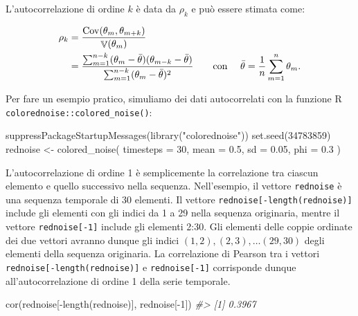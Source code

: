 \documentclass[
  11pt,
]{krantz}
\makeatletter
\newenvironment{Shaded}{\begin{snugshade}}{\end{snugshade}}
\newcommand{\AttributeTok}[1]{\textcolor[rgb]{0.61,0.61,0.61}{#1}}
\newcommand{\CommentTok}[1]{\textcolor[rgb]{0.37,0.37,0.37}{\textit{#1}}}
\newcommand{\DecValTok}[1]{\textcolor[rgb]{0.06,0.06,0.06}{#1}}
\newcommand{\FloatTok}[1]{\textcolor[rgb]{0.06,0.06,0.06}{#1}}
\newcommand{\FunctionTok}[1]{\textcolor[rgb]{0,0,0}{#1}}
\newcommand{\NormalTok}[1]{#1}
\newcommand{\OtherTok}[1]{\textcolor[rgb]{0.37,0.37,0.37}{#1}}
\newcommand{\SpecialCharTok}[1]{\textcolor[rgb]{0,0,0}{#1}}
\newcommand{\StringTok}[1]{\textcolor[rgb]{0.5,0.5,0.5}{#1}}
\newenvironment{kframe}{%
\medskip{}
\setlength{\fboxsep}{.8em}
 \def\at@end@of@kframe{}%
 \ifinner\ifhmode%
  \def\at@end@of@kframe{\end{minipage}}%
  \begin{minipage}{\columnwidth}%
 \fi\fi%
 \def\FrameCommand##1{\hskip\@totalleftmargin \hskip-\fboxsep
 \colorbox{shadecolor}{##1}\hskip-\fboxsep
     \hskip-\linewidth \hskip-\@totalleftmargin \hskip\columnwidth}%
 \MakeFramed {\advance\hsize-\width
   \@totalleftmargin\z@ \linewidth\hsize
   \@setminipage}}%
 {\par\unskip\endMakeFramed%
 \at@end@of@kframe}
\renewenvironment{Shaded}{\begin{kframe}}{\end{kframe}}
\DeclareMathOperator{\Var}{\mathbb{V}} %
\DeclareMathOperator{\Cov}{Cov} %
\theoremstyle{definition}
\theoremstyle{definition}
\theoremstyle{definition}
\theoremstyle{definition}
\theoremstyle{remark}
\makeatother
\begin{document}
L'autocorrelazione di ordine \(k\) è data da \(\rho_k\) e può essere stimata come:

\begin{align}
\rho_k &= \frac{\Cov(\theta_m, \theta_{m+k})}{\Var(\theta_m)}\notag\\
&= \frac{\sum_{m=1}^{n-k}(\theta_m - \bar{\theta})(\theta_{m-k} - \bar{\theta})}{\sum_{m=1}^{n-k}(\theta_m - \bar{\theta})^2} \qquad\text{con }\quad \bar{\theta} = \frac{1}{n}\sum_{m=1}^{n}\theta_m.
\label{eq:autocor}
\end{align}

Per fare un esempio pratico, simuliamo dei dati autocorrelati con la funzione R \texttt{colorednoise::colored\_noise()}:

\begin{Shaded}
\begin{Highlighting}[]
\FunctionTok{suppressPackageStartupMessages}\NormalTok{(}\FunctionTok{library}\NormalTok{(}\StringTok{"colorednoise"}\NormalTok{))}
\FunctionTok{set.seed}\NormalTok{(}\DecValTok{34783859}\NormalTok{)}
\NormalTok{rednoise }\OtherTok{\textless{}{-}} \FunctionTok{colored\_noise}\NormalTok{(}
  \AttributeTok{timesteps =} \DecValTok{30}\NormalTok{, }\AttributeTok{mean =} \FloatTok{0.5}\NormalTok{, }\AttributeTok{sd =} \FloatTok{0.05}\NormalTok{, }\AttributeTok{phi =} \FloatTok{0.3}
\NormalTok{)}
\end{Highlighting}
\end{Shaded}

L'autocorrelazione di ordine 1 è semplicemente la correlazione tra ciascun elemento e quello successivo nella sequenza. Nell'esempio, il vettore \texttt{rednoise} è una sequenza temporale di 30 elementi. Il vettore \texttt{rednoise{[}-length(rednoise){]}} include gli elementi con gli indici da 1 a 29 nella sequenza originaria, mentre il vettore \texttt{rednoise{[}-1{]}} include gli elementi 2:30. Gli elementi delle coppie ordinate dei due vettori avranno dunque gli indici \((1, 2), (2, 3), \dots (29, 30)\) degli elementi della sequenza originaria. La correlazione di Pearson tra i vettori \texttt{rednoise{[}-length(rednoise){]}} e \texttt{rednoise{[}-1{]}} corrisponde dunque all'autocorrelazione di ordine 1 della serie temporale.

\begin{Shaded}
\begin{Highlighting}[]
\FunctionTok{cor}\NormalTok{(rednoise[}\SpecialCharTok{{-}}\FunctionTok{length}\NormalTok{(rednoise)], rednoise[}\SpecialCharTok{{-}}\DecValTok{1}\NormalTok{])}
\CommentTok{\#\textgreater{} [1] 0.3967}
\end{Highlighting}
\end{Shaded}
\end{document}
